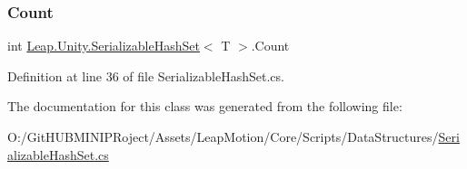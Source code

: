 \subsubsection{\texorpdfstring{Count}{Count}}
{\footnotesize\ttfamily int \mbox{\hyperlink{class_leap_1_1_unity_1_1_serializable_hash_set}{Leap.\+Unity.\+Serializable\+Hash\+Set}}$<$ T $>$.Count\hspace{0.3cm}{\ttfamily [get]}}



Definition at line 36 of file Serializable\+Hash\+Set.\+cs.



The documentation for this class was generated from the following file\+:\begin{DoxyCompactItemize}
\item 
O\+:/\+Git\+H\+U\+B\+M\+I\+N\+I\+P\+Roject/\+Assets/\+Leap\+Motion/\+Core/\+Scripts/\+Data\+Structures/\mbox{\hyperlink{_serializable_hash_set_8cs}{Serializable\+Hash\+Set.\+cs}}\end{DoxyCompactItemize}
